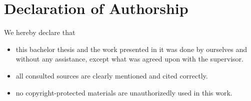 \chapter{Declaration of Authorship}
We hereby declare that
      \begin{itemize}
         \item this bachelor thesis and the work presented in it was done by ourselves and without any assistance, except what was agreed upon with the supervisor.
         \item all consulted sources are clearly mentioned and cited correctly.
         \item no copyright-protected materials are unauthorizedly used in this work.
      \end{itemize}
